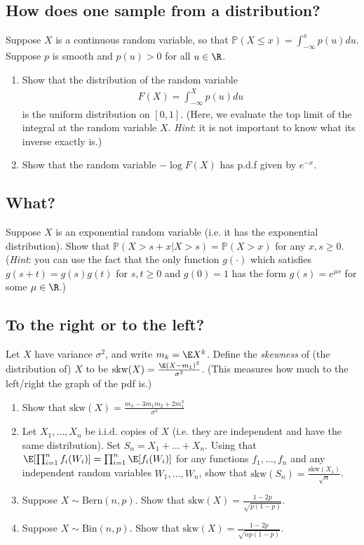 \documentclass[12pt,reqno]{amsart}
\theoremstyle{definition}
\theoremstyle{remark}
\numberwithin{equation}{section}
\begin{document}
\subsection{How does one sample from a distribution?}
Suppose $X$ is a continuous random variable, so that $\mathbb{P}(X\leq x)=\int_{-\infty}^{x}p(u)du$. Suppose $p$ is smooth and $p(u)>0$ for all $u\in\R$.
\begin{enumerate}
\item Show that the distribution of the random variable 
%
\begin{align*}
F(X)=\int_{-\infty}^{X}p(u)du
\end{align*}
%
is the uniform distribution on $[0,1]$. (Here, we evaluate the top limit of the integral at the random variable $X$. \emph{Hint}: it is not important to know what its inverse exactly is.)
\item Show that the random variable $-\log F(X)$ has p.d.f given by $e^{-x}$.
\end{enumerate}
\subsection{What?}
Suppose $X$ is an exponential random variable (i.e. it has the exponential distribution). Show that $\mathbb{P}(X>s+x|X>s)=\mathbb{P}(X>x)$ for any $x,s\geq0$. (\emph{Hint}: you can use the fact that the only function $g(\cdot)$ which satisfies $g(s+t)=g(s)g(t)$ for $s,t\geq0$ and $g(0)=1$ has the form $g(s)=e^{\mu s}$ for some $\mu\in\R$.)
\subsection{To the right or to the left?}
Let $X$ have variance $\sigma^{2}$, and write $m_{k}=\E X^{k}$. Define the \emph{skewness} of (the distribution of) $X$ to be $\mathrm{skw}(X)=\frac{\E(X-m_{1})^{3}}{\sigma^{3}}$. (This measures how much to the left/right the graph of the pdf is.)
\begin{enumerate}
\item Show that $\mathrm{skw}(X)=\frac{m_{3}-3m_{1}m_{2}+2m_{1}^{3}}{\sigma^{3}}$
\item Let $X_{1},\ldots,X_{n}$ be i.i.d. copies of $X$ (i.e. they are independent and have the same distribution). Set $S_{n}=X_{1}+\ldots+X_{n}$. Using that $\E[\prod_{i=1}^{n}f_{i}(W_{i})]=\prod_{i=1}^{n}\E[f_{i}(W_{i})]$ for any functions $f_{1},\ldots,f_{n}$ and any independent random variables $W_{1},\ldots,W_{n}$, show that $\mathrm{skw}(S_{n})=\frac{\mathrm{skw}(X_{1})}{\sqrt{n}}$.
\item Suppose $X\sim\mathrm{Bern}(n,p)$. Show that $\mathrm{skw}(X)=\frac{1-2p}{\sqrt{p(1-p)}}$.
\item Suppose $X\sim\mathrm{Bin}(n,p)$. Show that $\mathrm{skw}(X)=\frac{1-2p}{\sqrt{np(1-p)}}$.
\end{enumerate}
\end{document}
